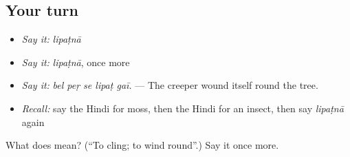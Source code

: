 \subsection*{Your turn}
\begin{itemize}
\raggedright
  \item \emph{Say it:} \emph{lipaṭnā}
  \item \emph{Say it:} \emph{lipaṭnā}, once more
  \item \emph{Say it:} \emph{bel peṛ se lipaṭ gaī.} — The creeper wound itself round the tree.
  \item \emph{Recall:} say the Hindi for moss, then the Hindi for an insect, then say \emph{lipaṭnā} again
\end{itemize}

\begin{tcolorbox}[breakable,colback=teal!4,colframe=teal!35!black,title={Before you move on}]
What does  mean? (\textquotedblleft{}To cling; to wind round\textquotedblright{}.) Say it once more.
\end{tcolorbox}
